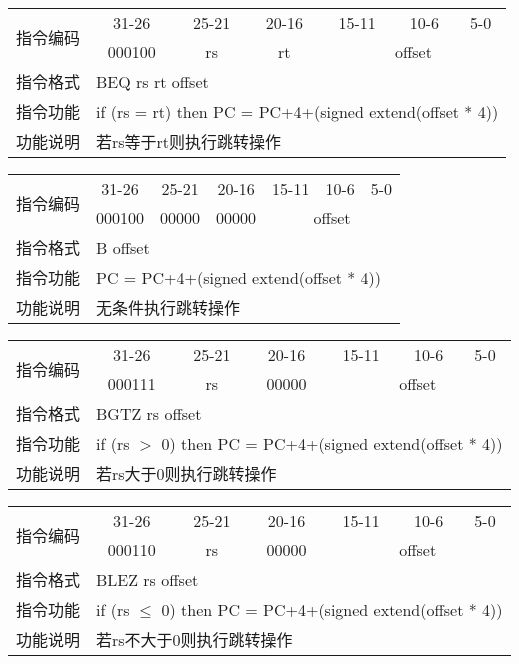 \documentclass[a4paper,UTF8,fntef]{ctexart}
\begin{document}
	\begin{table}[!hbp]
		\centering
		\begin{tabular}{|c|c|c|c|c|c|c|}
		\hline
		\multirow{2}{*}{指令编码} & 31-26&25-21 & 20-16&15-11 &10-6 &5-0\\
		\cline{2-7} & 000100 & rs & rt & \multicolumn{3}{|c|}{offset} \\
		\hline
		指令格式&\multicolumn{6}{|l|}{BEQ rs rt offset}\\
		\hline		
		指令功能&\multicolumn{6}{|l|}{if (rs = rt) then PC = PC+4+(signed extend(offset * 4))}\\
		\hline		
		功能说明&\multicolumn{6}{|l|}{若rs等于rt则执行跳转操作}\\
		\hline
		\end{tabular}
	\end{table}
	\begin{table}[!hbp]
		\centering
		\begin{tabular}{|c|c|c|c|c|c|c|}
		\hline
		\multirow{2}{*}{指令编码} & 31-26&25-21 & 20-16&15-11 &10-6 &5-0\\
		\cline{2-7} & 000100 & 00000 & 00000 & \multicolumn{3}{|c|}{offset} \\
		\hline
		指令格式&\multicolumn{6}{|l|}{B offset}\\
		\hline		
		指令功能&\multicolumn{6}{|l|}{PC = PC+4+(signed extend(offset * 4))}\\
		\hline		
		功能说明&\multicolumn{6}{|l|}{无条件执行跳转操作}\\
		\hline
		\end{tabular}
	\end{table}
	\begin{table}[!hbp]
		\centering
		\begin{tabular}{|c|c|c|c|c|c|c|}
		\hline
		\multirow{2}{*}{指令编码} & 31-26&25-21 & 20-16&15-11 &10-6 &5-0\\
		\cline{2-7} & 000111 & rs & 00000 & \multicolumn{3}{|c|}{offset} \\
		\hline
		指令格式&\multicolumn{6}{|l|}{BGTZ rs offset}\\
		\hline		
		指令功能&\multicolumn{6}{|l|}{if (rs $>$ 0) then PC = PC+4+(signed extend(offset * 4))}\\
		\hline		
		功能说明&\multicolumn{6}{|l|}{若rs大于0则执行跳转操作}\\
		\hline
		\end{tabular}
	\end{table}
	\begin{table}[!hbp]
		\centering
		\begin{tabular}{|c|c|c|c|c|c|c|}
		\hline
		\multirow{2}{*}{指令编码} & 31-26&25-21 & 20-16&15-11 &10-6 &5-0\\
		\cline{2-7} & 000110 & rs & 00000 & \multicolumn{3}{|c|}{offset} \\
		\hline
		指令格式&\multicolumn{6}{|l|}{BLEZ rs offset}\\
		\hline		
		指令功能&\multicolumn{6}{|l|}{if (rs $\leq$ 0) then PC = PC+4+(signed extend(offset * 4))}\\
		\hline		
		功能说明&\multicolumn{6}{|l|}{若rs不大于0则执行跳转操作}\\
		\hline
		\end{tabular}
	\end{table}
\end{document}

